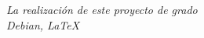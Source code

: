 \chapter*{}
\begin{flushright}
\textit{La realización de este proyecto de grado \\
        Debian, \LaTeX
        }
    \end{flushright}
\newpage
